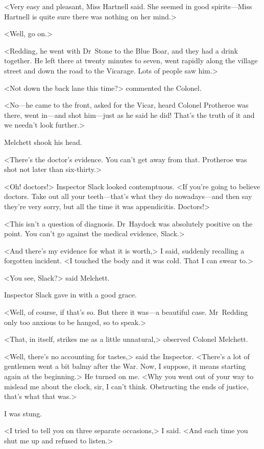 <Very easy and pleasant, Miss Hartnell said. She seemed in good spirits—Miss Hartnell is quite sure there was nothing on her mind.>

<Well, go on.>

<Redding, he went with Dr~Stone to the Blue Boar, and they had a drink together. He left there at twenty minutes to seven, went rapidly along the village street and down the road to the Vicarage. Lots of people saw him.>

<Not down the back lane this time?> commented the Colonel.

<No—he came to the front, asked for the Vicar, heard Colonel Protheroe was there, went in—and shot him—just as he said he did! That's the truth of it and we needn't look further.>

Melchett shook his head.

<There's the doctor's evidence. You can't get away from that. Protheroe was shot not later than six-thirty.>

<Oh! doctors!> Inspector Slack looked contemptuous. <If you're going to believe doctors. Take out all your teeth—that's what they do nowadays—and then say they're very sorry, but all the time it was appendicitis. Doctors!>

<This isn't a question of diagnosis. Dr~Haydock was absolutely positive on the point. You can't go against the medical evidence, Slack.>

<And there's my evidence for what it is worth,> I said, suddenly recalling a forgotten incident. <I touched the body and it was cold. That I can swear to.>

<You see, Slack?> said Melchett.

Inspector Slack gave in with a good grace.

<Well, of course, if that's so. But there it was—a beautiful case. Mr~Redding only too anxious to be hanged, so to speak.>

<That, in itself, strikes me as a little unnatural,> observed Colonel Melchett.

<Well, there's no accounting for tastes,> said the Inspector. <There's a lot of gentlemen went a bit balmy after the War. Now, I suppose, it means starting again at the beginning.> He turned on me. <Why you went out of your way to mislead me about the clock, sir, I can't think. Obstructing the ends of justice, that's what that was.>

I was stung.

<I tried to tell you on three separate occasions,> I said. <And each time you shut me up and refused to listen.>

